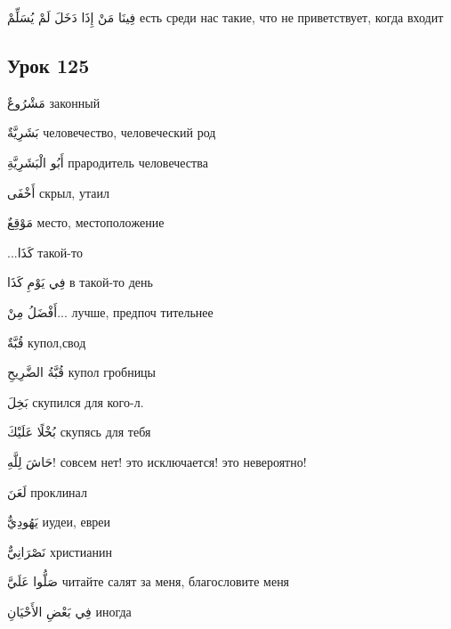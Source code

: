 \documentclass[a5paper]{article}
\newcommand\textstyleDropCaps[1]{#1}
\newcommand\textstyleCaptioncharacters[1]{#1}
\begin{document}
\textstyleCaptioncharacters{فِينَا مَنْ إِذَا دَخَلَ لَمْ يُسَلِّمْ }\textstyleDropCaps{есть среди нас такие, что не приветствует, когда входит‎}

\subsection[Урок 125‎]{\textstyleDropCaps{Урок 125‎}}
\textstyleCaptioncharacters{مَشْرُوعٌ }\textstyleDropCaps{законный‎}

\textstyleCaptioncharacters{بَشَرِيَّةٌ }\textstyleDropCaps{человечество, че­ловеческий род‎}

\textstyleCaptioncharacters{أَبُو الْبَشَرِيَّةِ }\textstyleDropCaps{прароди­тель человечества‎}

\textstyleCaptioncharacters{أَخْفَى }\textstyleDropCaps{скрыл, утаил‎}

\textstyleCaptioncharacters{مَوْقِعٌ }\textstyleDropCaps{место, местополо­жение‎}

\textstyleCaptioncharacters{...كَذَا }\textstyleDropCaps{такой-то‎}

\textstyleCaptioncharacters{فِي يَوْمِ كَذَا }\textstyleDropCaps{в такой-то день‎}

\textstyleCaptioncharacters{أَفْضَلُ مِنْ... }\textstyleDropCaps{лучше, предпоч тительнее‎}

\textstyleCaptioncharacters{قُبَّةٌ }\textstyleDropCaps{купол,свод‎}

\textstyleCaptioncharacters{قُبَّةُ الضَّرِيحِ }\textstyleDropCaps{купол гроб­ницы‎}

\textstyleCaptioncharacters{بَخِلَ }\textstyleDropCaps{скупился для кого-л.‎}

\textstyleCaptioncharacters{بُخْلًا عَلَيْكَ }\textstyleDropCaps{скупясь для тебя‎}

\textstyleCaptioncharacters{حَاشَ لِلَّهِ! }\textstyleDropCaps{совсем нет! это исключается! это невероятно!‎}

\textstyleCaptioncharacters{لَعَنَ }\textstyleDropCaps{проклинал‎}

\textstyleCaptioncharacters{يَهُودِيٌّ }\textstyleDropCaps{иудеи, евреи‎}

\textstyleCaptioncharacters{نَصْرَانِيٌّ }\textstyleDropCaps{христианин‎}

\textstyleCaptioncharacters{صَلُّوا عَلَيَّ }\textstyleDropCaps{читайте салят за меня, благословите меня‎}

\textstyleCaptioncharacters{فِي بَعْضِ الأَحْيَانِ }\textstyleDropCaps{ино­гда‎}
\end{document}
